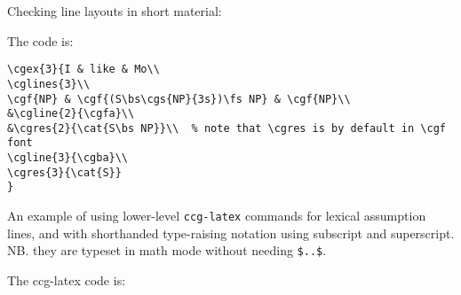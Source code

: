 \documentclass[11pt]{article}
\begin{document}
Checking line layouts in short material:

The code is: \begin{verbatim}
\cgex{3}{I & like & Mo\\
\cglines{3}\\
\cgf{NP} & \cgf{(S\bs\cgs{NP}{3s})\fs NP} & \cgf{NP}\\
&\cgline{2}{\cgfa}\\
&\cgres{2}{\cat{S\bs NP}}\\  % note that \cgres is by default in \cgf font
\cgline{3}{\cgba}\\
\cgres{3}{\cat{S}}
}
\end{verbatim}

\newpage
An example of using lower-level \verb|ccg-latex| commands for lexical assumption lines, and with shorthanded 
type-raising notation using subscript and superscript. NB. they are typeset in math mode without needing \verb|$..$|.\bigskip

\bigskip

The ccg-latex code is:
\end{document}
